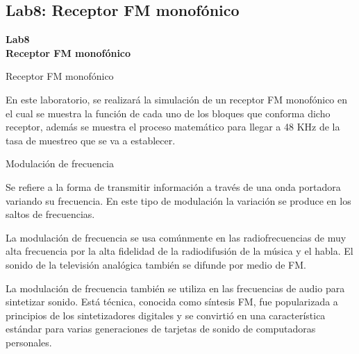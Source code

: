 \subsection{Lab8: Receptor FM monofónico}
\begin{frame}{}


\bfseries{\textrm{\LARGE Lab8\\ \Large Receptor FM monofónico}}
\raggedright
\end{frame}



\begin{frame}{Receptor FM monofónico}



En este laboratorio, se realizará la simulación de un receptor FM monofónico en el cual se muestra la función de cada uno de los bloques que conforma dicho receptor, además se muestra el proceso matemático para llegar a 48 KHz de la tasa de muestreo que se va a establecer.



\end{frame}

\begin{frame}{Modulación de frecuencia}

Se refiere a la forma de transmitir información a través de una onda portadora variando su frecuencia. En este tipo de modulación la variación se produce en los saltos de frecuencias. \\ \vspace{2mm}

La modulación de frecuencia se usa comúnmente en las radiofrecuencias de muy alta frecuencia por la alta fidelidad de la radiodifusión de la música y el habla. El sonido de la televisión analógica también se difunde por medio de FM. \\ \vspace{2mm}

La modulación de frecuencia también se utiliza en las frecuencias de audio para sintetizar sonido. Está técnica, conocida como síntesis FM, fue popularizada a principios de los sintetizadores digitales y se convirtió en una característica estándar para varias generaciones de tarjetas de sonido de computadoras personales.

\end{frame}


